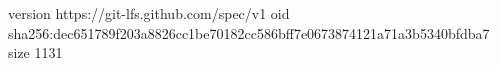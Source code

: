 version https://git-lfs.github.com/spec/v1
oid sha256:dec651789f203a8826cc1be70182cc586bff7e0673874121a71a3b5340bfdba7
size 1131
